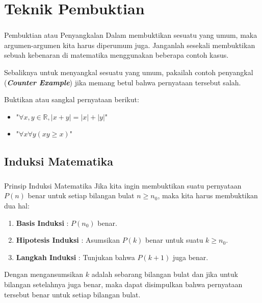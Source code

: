 \documentclass{../praktikum-ppt}
\begin{document}
    \section{Teknik Pembuktian}
    \begin{frame}
      \frametitle{\insertsection}
      \begin{alertblock}{Pembuktian atau Penyangkalan}
        Dalam membuktikan sesuatu yang umum, maka argumen-argumen kita harus diperumum juga. Janganlah sesekali membuktikan sebuah kebenaran di matematika menggunakan beberapa contoh kasus.

        Sebaliknya untuk menyangkal sesuatu yang umum, pakailah contoh penyangkal (\textbf{\textit{Counter Example}}) jika memang betul bahwa pernyataan tersebut salah.
      \end{alertblock}
      \begin{contoh}
        Buktikan atau sangkal pernyataan berikut:
        \begin{itemize}
          \item "$\forall x,y\in\mathbb{R}, |x+y| = |x| + |y|$"
          \item "$\forall x\forall y(xy\geq x)$"
        \end{itemize}
      \end{contoh}
    \end{frame}

    \subsection{Induksi Matematika}
    \begin{frame}
      \frametitle{\insertsection}
      \framesubtitle{\insertsubsection}
      \begin{block}{Prinsip Induksi Matematika}
        Jika kita ingin membuktikan suatu pernyataan $P(n)$ benar untuk setiap bilangan bulat $n\geq n_0$, maka kita harus membuktikan dua hal:
        \begin{enumerate}
          \item \textbf{Basis Induksi} : $P(n_0)$ benar.
          \item \textbf{Hipotesis Induksi} : Asumsikan $P(k)$ benar untuk suatu $k\geq n_0$.
          \item \textbf{Langkah Induksi} : Tunjukan bahwa $P(k+1)$ juga benar.
        \end{enumerate}
      \end{block}
      Dengan mengansumsikan $k$ adalah sebarang bilangan bulat dan jika untuk bilangan setelahnya juga benar, maka dapat disimpulkan bahwa pernyataan tersebut benar untuk setiap bilangan bulat.
    \end{frame}
\end{document}
